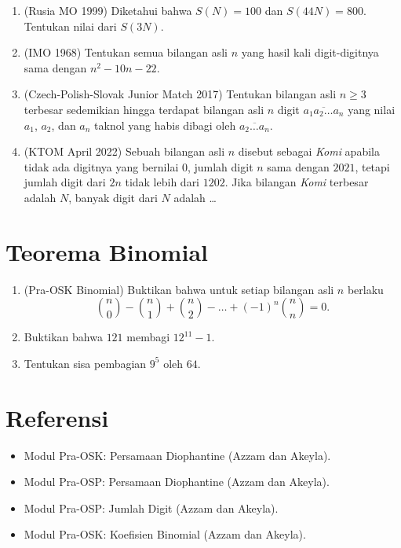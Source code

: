 \documentclass[12pt]{scrartcl}
\begin{document}
\begin{enumerate}[resume]
	\item (Rusia MO 1999)
	Diketahui bahwa $S(N) = 100$ dan $S(44N) = 800$.
	Tentukan nilai dari $S(3N)$.

	\item (IMO 1968)
	Tentukan semua bilangan asli $n$ yang hasil kali digit-digitnya sama dengan $n^2 - 10n - 22$.

	\item (Czech-Polish-Slovak Junior Match 2017)
	Tentukan bilangan asli $n \ge 3$ terbesar sedemikian hingga terdapat bilangan asli $n$ digit
	$\overline{a_1a_2\dots a_n}$ yang nilai $a_1$, $a_2$, dan $a_n$ taknol
	yang habis dibagi oleh $\overline{a_2\dots a_n}$.

	\item (KTOM April 2022)
	Sebuah bilangan asli $n$ disebut sebagai \textit{Komi} apabila tidak ada digitnya
	yang bernilai $0$, jumlah digit $n$ sama dengan $2021$,
	tetapi jumlah digit dari $2n$ tidak lebih dari $1202$.
	Jika bilangan \textit{Komi} terbesar adalah $N$, banyak digit dari $N$ adalah \dots

\end{enumerate}

\section{Teorema Binomial}
\begin{enumerate}[resume]

	\item (Pra-OSK Binomial)
	Buktikan bahwa untuk setiap bilangan asli $n$ berlaku
	\[ \binom{n}{0} - \binom{n}{1} + \binom{n}{2} - \dots + (-1)^n\binom{n}{n} = 0. \]

	\item Buktikan bahwa $121$ membagi $12^{11} - 1$.

	\item Tentukan sisa pembagian $9^5$ oleh $64$.

\end{enumerate}

\section{Referensi}
\begin{itemize}
    \item Modul Pra-OSK: Persamaan Diophantine (Azzam dan Akeyla).
    \item Modul Pra-OSP: Persamaan Diophantine (Azzam dan Akeyla).
    \item Modul Pra-OSP: Jumlah Digit (Azzam dan Akeyla).
    \item Modul Pra-OSK: Koefisien Binomial (Azzam dan Akeyla).
\end{itemize}
\end{document}
